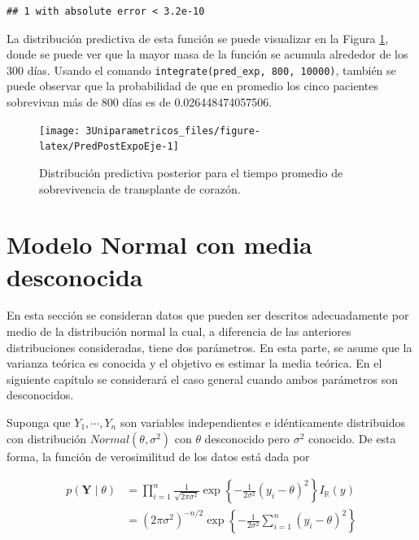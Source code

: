 \documentclass[
  10pt,
  spanish,
]{book}
\theoremstyle{definition}
\theoremstyle{definition}
\theoremstyle{definition}
\theoremstyle{definition}
\theoremstyle{remark}
\begin{document}
\begin{verbatim}
## 1 with absolute error < 3.2e-10
\end{verbatim}

La distribución predictiva de esta función se puede visualizar en la Figura \ref{fig:PredPostExpoEje}, donde se puede ver que la mayor masa de la función se acumula alrededor de los 300 días. Usando el comando \texttt{integrate(pred\_exp,\ 800,\ 10000)}, también se puede observar que la probabilidad de que en promedio los cinco pacientes sobrevivan más de 800 días es de 0.026448474057506.

\begin{figure}

{\centering \texttt{[image: 3Uniparametricos\_files/figure-latex/PredPostExpoEje-1]} 

}

\caption{Distribución predictiva posterior para el tiempo promedio de sobrevivencia de transplante de corazón.}\label{fig:PredPostExpoEje}
\end{figure}

\hypertarget{modelo-normal-con-media-desconocida}{%
\section{Modelo Normal con media desconocida}\label{modelo-normal-con-media-desconocida}}

En esta sección se consideran datos que pueden ser descritos adecuadamente por medio de la distribución normal la cual, a diferencia de las anteriores distribuciones consideradas, tiene dos parámetros. En esta parte, se asume que la varianza teórica es conocida y el objetivo es estimar la media teórica. En el siguiente capítulo se considerará el caso general cuando ambos parámetros son desconocidos.

Suponga que \(Y_1,\cdots,Y_n\) son variables independientes e idénticamente distribuidos con distribución \(Normal(\theta,\sigma^2)\) con \(\theta\) desconocido pero \(\sigma^2\) conocido. De esta forma, la función de verosimilitud de los datos está dada por

\begin{align}
\label{eq:veronormal}
p(\mathbf{Y} \mid \theta)&=\prod_{i=1}^n\frac{1}{\sqrt{2\pi\sigma^2}}\exp\left\{-\frac{1}{2\sigma^2}(y_i-\theta)^2\right\}I_\mathbb{R}(y)\\
&=(2\pi\sigma^2)^{-n/2}\exp\left\{-\frac{1}{2\sigma^2}\sum_{i=1}^n(y_i-\theta)^2\right\}
\end{align}
\end{document}
